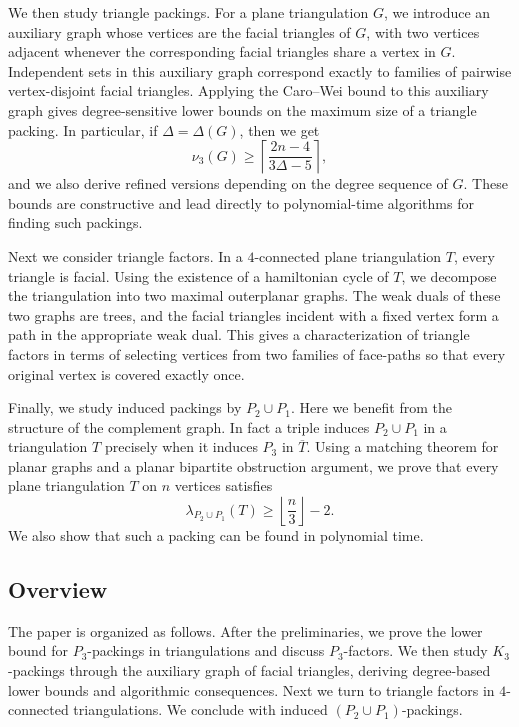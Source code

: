 \documentclass{patmorin}
\begin{document}
We then study triangle packings. For a plane triangulation $G$, we introduce an auxiliary graph whose vertices are the facial triangles of $G$, with two vertices adjacent whenever the corresponding facial triangles share a vertex in $G$. 
Independent sets in this auxiliary graph correspond exactly to families of pairwise vertex-disjoint facial triangles. 
Applying the Caro--Wei bound to this auxiliary graph gives degree-sensitive lower bounds on the maximum size of a triangle packing. 
In particular, if $\Delta=\Delta(G)$, then we get 
\[
\nu_3(G)\ge
\left\lceil
\frac{2n-4}{3\Delta-5}
\right\rceil ,
\]
and we also derive refined versions depending on the degree sequence of $G$. These bounds are constructive and lead directly to polynomial-time algorithms for finding such packings.

Next we consider triangle factors. 
In a $4$-connected plane triangulation $T$, every triangle is facial. Using the existence of a hamiltonian cycle of $T$, we decompose the triangulation into two maximal outerplanar graphs. The weak duals of these two graphs are trees, and the facial triangles incident with a fixed vertex form a path in the appropriate weak dual. This gives a characterization of triangle factors in terms of selecting vertices from two families of face-paths so that every original vertex is covered exactly once.

Finally, we study induced packings by $P_2\cup P_1$. 
Here we benefit from the structure of the complement graph.
In fact a triple induces $P_2\cup P_1$ in a triangulation $T$ precisely when it induces $P_3$ in $\overline T$. Using a matching theorem for planar graphs and a planar bipartite obstruction argument, we prove that every plane triangulation $T$ on $n$ vertices satisfies
\[
\lambda_{P_2\cup P_1}(T)
\ge
\left\lfloor \frac n3\right\rfloor -2 .
\]
We also show that such a packing can be found in polynomial time.

\subsection{Overview}

The paper is organized as follows. After the preliminaries, we prove the lower bound for $P_3$-packings in triangulations and discuss $P_3$-factors. We then study $K_3$-packings through the auxiliary graph of facial triangles, deriving degree-based lower bounds and algorithmic consequences. Next we turn to triangle factors in $4$-connected triangulations. We conclude with induced $(P_2\cup P_1)$-packings.
\end{document}
